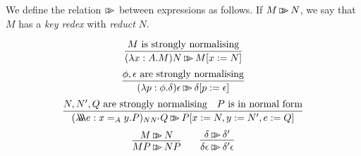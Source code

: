 
We define the relation $\mathop{\rhd \!\!\! \rhd}$ between expressions as follows.  If $M \mathop{\rhd \!\!\! \rhd} N$, we say that $M$ has a \emph{key redex} with \emph{reduct} $N$.

\[ \infer{(\lambda x:A.M)N \kr M[x:= N]}{M \text{ is strongly normalising}} \]
\[ \infer{(\lambda p:\phi.\delta)\epsilon \kr \delta[p:= \epsilon]}{\phi, \epsilon \text{ are strongly normalising}} \]
\[ \infer{(\triplelambda e:x =_A y.P)_{N N'} Q \kr P[x:= N, y:= N', e:= Q]}{N, N', Q \text{ are strongly normalising} \quad P \text{ is in normal form}} \]
\[ \infer{MP \kr NP}{M \kr N} \qquad \infer{\delta \epsilon \kr \delta' \epsilon}{\delta \kr \delta'} \]

